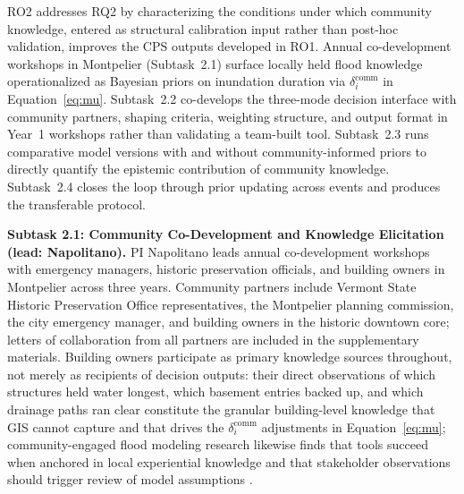 \documentclass[11pt]{article}
\begin{document}
RO2 addresses RQ2 by characterizing the conditions under which community knowledge,
entered as structural calibration input rather than post-hoc validation, improves
the CPS outputs developed in RO1.
Annual co-development workshops in Montpelier (Subtask~2.1) surface locally held
flood knowledge operationalized as Bayesian priors on inundation duration via
$\delta_i^{\mathrm{comm}}$ in Equation~\eqref{eq:mu}.
Subtask~2.2 co-develops the three-mode decision interface with community partners,
shaping criteria, weighting structure, and output format in Year~1 workshops rather
than validating a team-built tool.
Subtask~2.3 runs comparative model versions with and without community-informed
priors to directly quantify the epistemic contribution of community knowledge.
Subtask~2.4 closes the loop through prior updating across events and produces the
transferable protocol.

\textbf{Subtask 2.1: Community Co-Development and Knowledge Elicitation
(lead: Napolitano).}
PI Napolitano leads annual co-development workshops with emergency managers, historic
preservation officials, and building owners in Montpelier across three years.
Community partners include Vermont State Historic Preservation Office representatives,
the Montpelier planning commission, the city emergency manager, and building owners
in the historic downtown core; letters of collaboration from all partners are included
in the supplementary materials.
Building owners participate as primary knowledge sources throughout, not merely as
recipients of decision outputs: their direct observations of which structures held
water longest, which basement entries backed up, and which drainage paths ran clear
constitute the granular building-level knowledge that GIS cannot capture and that
drives the $\delta_i^{\mathrm{comm}}$ adjustments in Equation~\eqref{eq:mu}; community-engaged
flood modeling research likewise finds that tools succeed when anchored in local
experiential knowledge and that stakeholder observations should trigger review of
model assumptions \cite{skilton2022dontwant,habib2026sustaining}.
\end{document}

